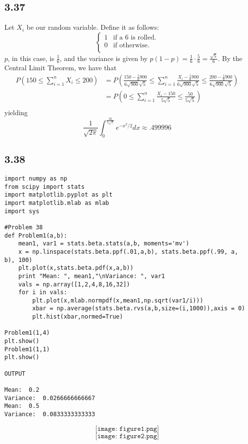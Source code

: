 \documentclass[letterpaper,12pt]{article}
\theoremstyle{definition}
\begin{document}
\subsection*{3.37}

Let $X_i$ be our random variable. Define it as follows:
\[
\begin{cases}
    1 & \text{if a 6 is rolled.}\\
    0 & \text{if otherwise.}\\
\end{cases}
\]
$p$, in this case, is $\frac{1}{6}$, and the variance is given by $p(1-p) = \frac{1}{6}\cdot\frac{5}{6} = \frac{\sqrt{5}}{6}$. By the Central Limit Theorem, we have that
\begin{align*}
    P\left( 150 \leq \sum^{n}_{i=1} X_i \leq 200 \right) &= P\left( \frac{150 - \frac{1}{6}900}{6\sqrt{900}\sqrt{5}} \leq \sum^{n}_{i=1} \frac{X_i - \frac{1}{6}900}{6\sqrt{900}\sqrt{5}} \leq \frac{200-\frac{1}{6}900}{6\sqrt{900}\sqrt{5}} \right) \\
    &= P\left( 0 \leq \sum^{n}_{i=1} \frac{X_i - 150}{5\sqrt{5}} \leq \frac{50}{5\sqrt{5}} \right) \\
\end{align*}
yielding
\[ \frac{1}{\sqrt{2 \pi}} \int_{0}^{\frac{50}{5\sqrt{5}}} e^{-x^2/2}dx \approx .499996\]

\subsection*{3.38}
\begin{lstlisting}
import numpy as np
from scipy import stats
import matplotlib.pyplot as plt
import matplotlib.mlab as mlab
import sys

#Problem 38
def Problem1(a,b):
    mean1, var1 = stats.beta.stats(a,b, moments='mv')
    x = np.linspace(stats.beta.ppf(.01,a,b), stats.beta.ppf(.99, a, b), 100)
    plt.plot(x,stats.beta.pdf(x,a,b))
    print "Mean: ", mean1,"\nVariance: ", var1
    vals = np.array([1,2,4,8,16,32])
    for i in vals:
        plt.plot(x,mlab.normpdf(x,mean1,np.sqrt(var1/i)))
        xbar = np.average(stats.beta.rvs(a,b,size=(i,1000)),axis = 0)
        plt.hist(xbar,normed=True)

Problem1(1,4)
plt.show()
Problem1(1,1)
plt.show()

OUTPUT

Mean:  0.2
Variance:  0.0266666666667
Mean:  0.5
Variance:  0.0833333333333
\end{lstlisting}
\[\texttt{[image: figure1.png]}\]
\[\texttt{[image: figure2.png]}\]
\end{document}
